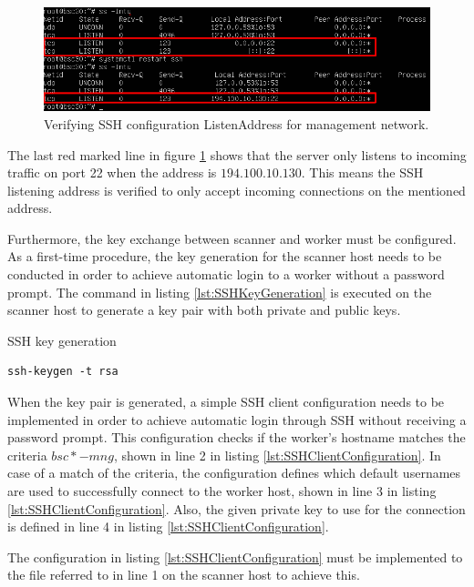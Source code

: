 \begin{figure}[htbp]
\centerline{\includegraphics[scale=0.55]{images/misc/SSH-Verified.png}}
\caption{Verifying SSH configuration ListenAddress for management network.}
\label{fig:SSHMngNetwork}
\end{figure}

The last red marked line in figure \ref{fig:SSHMngNetwork} shows that the server only listens to incoming traffic on port 22 when the address is $194.100.10.130$. This means the SSH listening address is verified to only accept incoming connections on the mentioned address.


Furthermore, the key exchange between scanner and worker must be configured.
As a first-time procedure, the key generation for the scanner host needs to be conducted in order to achieve automatic login to a worker without a password prompt.
The command in listing \ref{lst:SSHKeyGeneration} is executed on the scanner host to generate a key pair with both private and public keys.


\begin{listing}[!ht]
\caption{SSH key generation}
\label{lst:SSHKeyGeneration}
\begin{verbatim}
ssh-keygen -t rsa
\end{verbatim}
\end{listing}


When the key pair is generated, a simple SSH client configuration needs to be implemented in order to achieve automatic login through SSH without receiving a password prompt.
This configuration checks if the worker's hostname matches the criteria $bsc*-mng$, shown in line 2 in listing \ref{lst:SSHClientConfiguration}. In case of a match of the criteria, the configuration defines which default usernames are used to successfully connect to the worker host, shown in line 3 in listing \ref{lst:SSHClientConfiguration}. Also, the given private key to use for the connection is defined in line 4 in listing \ref{lst:SSHClientConfiguration}.

The configuration in listing \ref{lst:SSHClientConfiguration} must be implemented to the file referred to in line 1 on the scanner host to achieve this.

